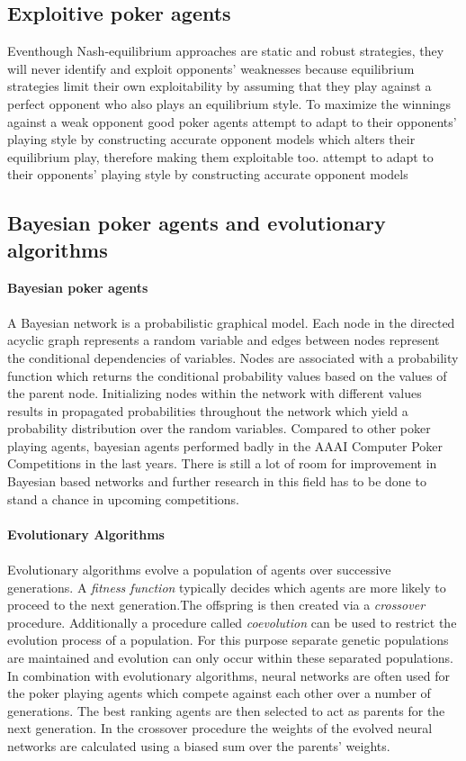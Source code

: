 \subsection{Exploitive poker agents}
Eventhough Nash-equilibrium approaches are static and robust strategies, they will never identify and exploit opponents' weaknesses because equilibrium strategies limit their own exploitability by assuming that they play against a perfect opponent who also plays an equilibrium style.\cite{review} To maximize the winnings against a weak opponent good poker agents attempt to adapt to their opponents' playing style by constructing accurate opponent models which alters their equilibrium play, therefore making them exploitable too.
attempt to adapt to their opponents' playing style by constructing accurate opponent models
\subsection{Bayesian poker agents and evolutionary algorithms}
\textbf{Bayesian poker agents}\\\\
A Bayesian network is a probabilistic graphical model. Each node in the directed acyclic graph represents a random variable and edges between nodes represent the conditional dependencies of variables. Nodes are associated with a probability function which returns the conditional probability values based on the values of the parent node. Initializing nodes within the network with different values results in propagated probabilities throughout the network which yield a probability distribution over the random variables. Compared to other poker playing agents, bayesian agents performed badly in the AAAI Computer Poker Competitions in the last years. There is still a lot of room for improvement in Bayesian based networks and further research in this field has to be done to stand a chance in upcoming competitions. \cite{review}\\\\
\textbf{Evolutionary Algorithms}\\\\
Evolutionary algorithms evolve a population of agents over successive generations. A \textit{fitness function} typically decides which agents are more likely to proceed to the next generation.The  offspring is then created via a \textit{crossover} procedure. Additionally a procedure called \textit{coevolution} can be used  to restrict the evolution process of a population. For this purpose separate genetic populations are maintained and evolution can only occur within these separated populations. In combination with evolutionary algorithms, neural networks are often used for the poker playing agents which compete against each other over a number of generations. The best ranking agents are then selected to act as parents for the next generation. In the crossover procedure the weights of the evolved neural networks are calculated using a biased sum over the parents' weights.\cite{review}

